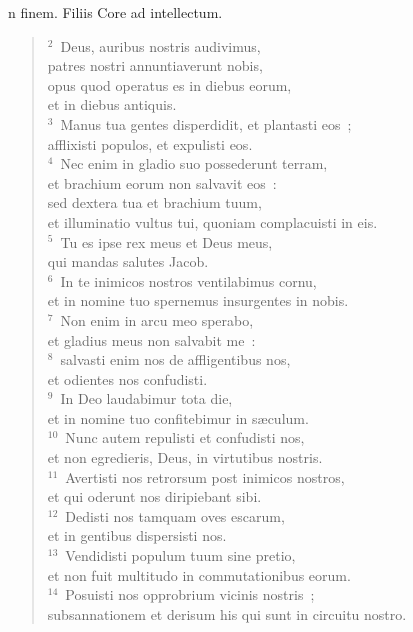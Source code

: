 \bchapter[Psalm]
n finem. Filiis Core ad intellectum.
\begin{verse}${}^{2}$~Deus, auribus nostris audivimus,\\ patres nostri annuntiaverunt nobis,\\ opus quod operatus es in diebus eorum,\\ et in diebus antiquis.\\
${}^{3}$~Manus tua gentes disperdidit, et plantasti eos~;\\ afflixisti populos, et expulisti eos.\\
${}^{4}$~Nec enim in gladio suo possederunt terram,\\ et brachium eorum non salvavit eos~:\\ sed dextera tua et brachium tuum,\\ et illuminatio vultus tui, quoniam complacuisti in eis.\\
${}^{5}$~Tu es ipse rex meus et Deus meus,\\ qui mandas salutes Jacob.\\
${}^{6}$~In te inimicos nostros ventilabimus cornu,\\ et in nomine tuo spernemus insurgentes in nobis.\\
${}^{7}$~Non enim in arcu meo sperabo,\\ et gladius meus non salvabit me~:\\
${}^{8}$~salvasti enim nos de affligentibus nos,\\ et odientes nos confudisti.\\
${}^{9}$~In Deo laudabimur tota die,\\ et in nomine tuo confitebimur in s\ae culum.\\
${}^{10}$~Nunc autem repulisti et confudisti nos,\\ et non egredieris, Deus, in virtutibus nostris.\\
${}^{11}$~Avertisti nos retrorsum post inimicos nostros,\\ et qui oderunt nos diripiebant sibi.\\
${}^{12}$~Dedisti nos tamquam oves escarum,\\ et in gentibus dispersisti nos.\\
${}^{13}$~Vendidisti populum tuum sine pretio,\\ et non fuit multitudo in commutationibus eorum.\\
${}^{14}$~Posuisti nos opprobrium vicinis nostris~;\\ subsannationem et derisum his qui sunt in circuitu nostro.\\

\end{verse}
